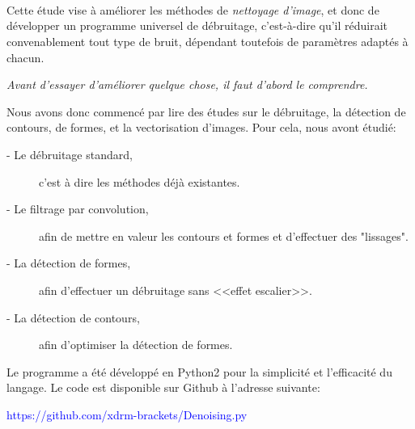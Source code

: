 \documentclass{article}
\begin{document}
			\\
			\\
			
			
			\hrulefill\\
		
			Cette étude vise à améliorer les méthodes de \emph{nettoyage d'image}, et donc de développer un programme universel de débruitage, c'est-à-dire qu'il réduirait convenablement tout type de bruit, dépendant toutefois de paramètres adaptés à chacun.
			\begin{center} \emph{Avant d'essayer d'améliorer quelque chose, il faut d'abord le comprendre.} \end{center}
			Nous avons donc commencé par lire des études sur le débruitage, la détection de contours, de formes, et la vectorisation d'images.
			\noindent Pour cela, nous avont étudié:
			\begin{description}
				\item[ - Le débruitage standard,]c'est à dire les méthodes déjà existantes.
				\item[ - Le filtrage par convolution,]afin de mettre en valeur les contours et formes et d'effectuer des "lissages".
				\item[ - La détection de formes,]afin d'effectuer un débruitage sans <<effet escalier>>.
				\item[ - La détection de contours,]afin d'optimiser la détection de formes.
			\end{description}
			Le programme a été développé en Python2 pour la simplicité et l'efficacité du langage. Le code est disponible sur Github à l'adresse suivante:
			\begin{center} \textcolor{blue}{https://github.com/xdrm-brackets/Denoising.py} \end{center}
\end{document}
